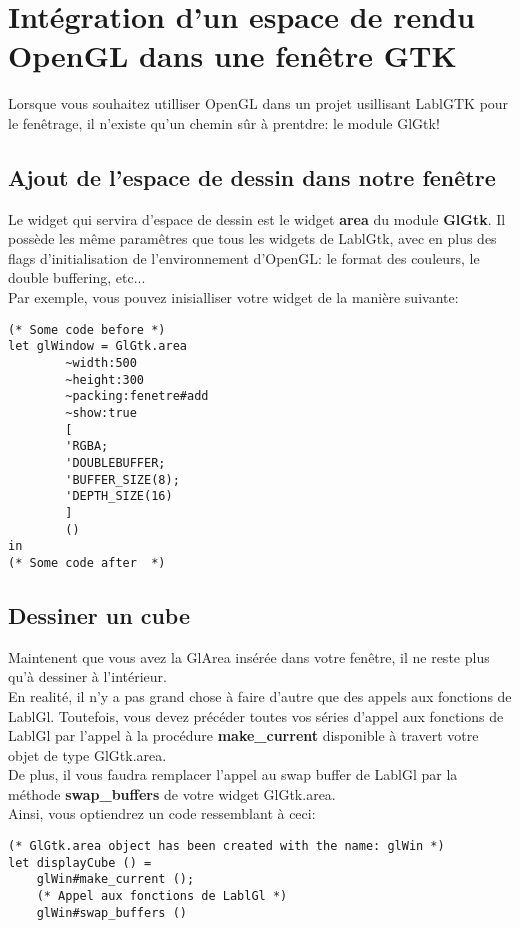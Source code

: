 \section{Intégration d'un espace de rendu OpenGL dans une fenêtre GTK}
Lorsque vous souhaitez utilliser OpenGL dans un projet usillisant 
LablGTK pour le fenêtrage, il n'existe qu'un chemin sûr à prentdre: le module GlGtk!
\subsection{Ajout de l'espace de dessin dans notre fenêtre}
Le widget qui servira d'espace de dessin est le widget {\bf area}
du module {\bf GlGtk}. Il possède les même paramêtres que tous
les widgets de LablGtk, avec en plus des flags d'initialisation de
l'environnement d'OpenGL: le format des couleurs, le double buffering,
etc...\\
Par exemple, vous pouvez inisialliser votre widget de la manière suivante:

\begin{lstlisting}
(* Some code before *)
let glWindow = GlGtk.area
		~width:500
		~height:300
		~packing:fenetre#add
		~show:true
		[
		'RGBA;
		'DOUBLEBUFFER;
		'BUFFER_SIZE(8);
		'DEPTH_SIZE(16)
		]
		()
in
(* Some code after  *)
\end{lstlisting}
\subsection{Dessiner un cube}
Maintenent que vous avez la GlArea insérée dans votre fenêtre, il
ne reste plus qu'à dessiner à l'intérieur.\\
En realité, il n'y a pas grand chose à faire d'autre que des
appels aux fonctions de LablGl. Toutefois, vous devez précéder 
toutes vos séries d'appel aux fonctions de LablGl par l'appel
à la procédure {\bf make\_current} disponible à travert votre
objet de type GlGtk.area.\\

De plus, il vous faudra remplacer l'appel au swap buffer de LablGl
par la méthode {\bf swap\_buffers} de votre widget GlGtk.area.\\
Ainsi, vous optiendrez un code ressemblant à ceci:\\

\begin{lstlisting}
(* GlGtk.area object has been created with the name: glWin *)
let displayCube () =
	glWin#make_current ();
	(* Appel aux fonctions de LablGl *)
	glWin#swap_buffers ()
\end{lstlisting}

